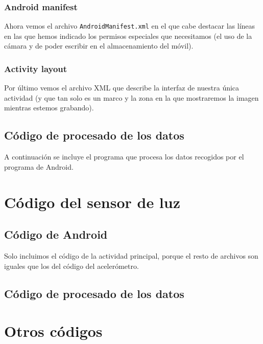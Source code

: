 \documentclass[a4paper,openright, 12pt]{book}
\begin{document}
\subsection{Android manifest}
Ahora vemos el archivo \lstinline|AndroidManifest.xml| en el que cabe destacar las líneas en las que hemos indicado los permisos especiales que necesitamos (el uso de la cámara y de poder escribir en el almacenamiento del móvil).


\subsection{Activity layout}
Por último vemos el archivo XML que describe la interfaz de nuestra única actividad (y que tan solo es un marco y la zona en la que mostraremos la imagen mientras estemos grabando).


\newpage
\section{Código de procesado de los datos} \label{ap_acc}
A continuación se incluye el programa que procesa los datos recogidos por el programa de Android.

\newpage


\chapter{Código del sensor de luz} 
\section{Código de Android} \label{android_ap_illu}
Solo incluimos el código de la actividad principal, porque el resto de archivos son iguales que los del código del acelerómetro.

\newpage
\section{Código de procesado de los datos} \label{ap_illu}

\newpage
\chapter{Otros códigos} 
\end{document}

